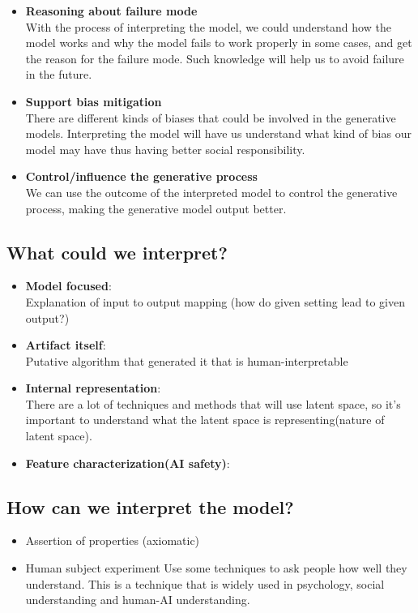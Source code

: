 \documentclass[]{article}
\begin{document}
\begin{itemize}
\item \textbf{Reasoning about failure mode}\\
With the process of interpreting the model, we could understand how the model works and why the model fails to work properly in some cases, and get the reason for the failure mode. Such knowledge will help us to avoid failure in the future.
\item \textbf{Support bias mitigation}\\
There are different kinds of biases that could be involved in the generative models. Interpreting the model will have us understand what kind of bias our model may have thus having better social responsibility.
\item \textbf{Control/influence the generative process}\\
We can use the outcome of the interpreted model to control the generative process, making the generative model output better.
\end{itemize}

\subsection{What could we interpret?}
\begin{itemize}
\item \textbf{Model focused}:\\
Explanation of input to output mapping (how do given setting lead to given output?) \cite{b14}
\item \textbf{Artifact itself}: \\
Putative algorithm that generated it that is human-interpretable \cite{b14}
\item \textbf{Internal representation}:\\
There are a lot of techniques and methods that will use latent space, so it's important to understand what the latent space is representing(nature of latent space). 
\item\textbf{Feature characterization(AI safety)}: \\
\end{itemize}


\subsection{How can we interpret the model?}
\begin{itemize}
\item {Assertion of properties (axiomatic)} 

\item {Human subject experiment} 
Use some techniques to ask people how well they understand. This is a technique that is widely used in psychology, social understanding and human-AI understanding.
\end{itemize}
\end{document}
